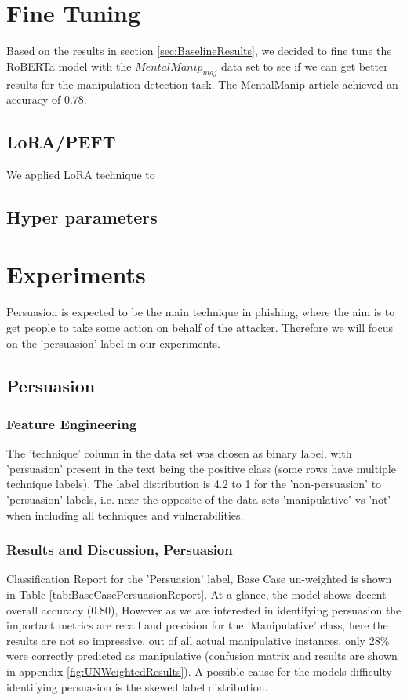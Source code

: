 \documentclass[
	letterpaper, %
	12pt, %
	unnumberedsections, %
	twoside, %
]{LTJournalArticle}
\begin{document}
\section{Fine Tuning}
Based on the results in section \ref{sec:BaselineResults}, we decided to fine tune the RoBERTa model with the $MentalManip_{maj}$ data set to see if we can get better results for the manipulation detection task. The MentalManip article\cite{MentalManip} achieved an accuracy of 0.78.

\subsection{LoRA/PEFT}
We applied LoRA technique to 
\subsection{Hyper parameters}







\section{Experiments}
Persuasion is expected to be the main technique in phishing, where the aim is to get people to take some action on behalf of the attacker. Therefore we will focus on the 'persuasion' label in our experiments.

\subsection{Persuasion}
\subsubsection{Feature Engineering}
The 'technique' column in the data set was chosen as binary label, with 'persuasion' present in the text being the positive class (some rows have multiple technique labels). The label distribution is 4.2 to 1 for the 'non-persuasion' to 'persuasion' labels, i.e. near the opposite of the data sets 'manipulative' vs 'not' when including all techniques and vulnerabilities.

\subsubsection{Results and Discussion, Persuasion}
Classification Report for the 'Persuasion' label, Base Case un-weighted is shown in Table \ref{tab:BaseCasePersuasionReport}. At a glance, the model shows decent overall accuracy (0.80), However as we are interested in identifying persuasion the important metrics are recall and precision for the 'Manipulative' class, here the results are not so impressive, out of all actual manipulative instances, only 28\% were correctly predicted as manipulative (confusion matrix and results are shown in appendix \ref{fig:UNWeightedResults}). A possible cause for the models difficulty identifying persuasion is the skewed label distribution.
\end{document}
